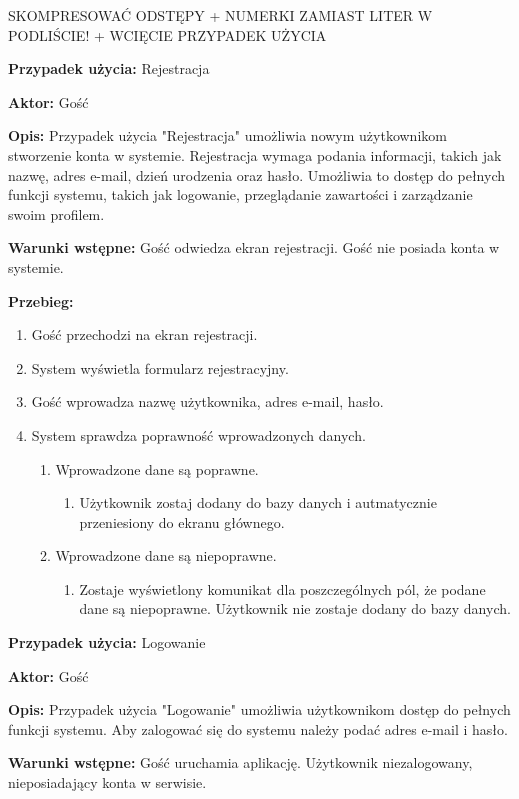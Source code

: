 SKOMPRESOWAĆ ODSTĘPY + NUMERKI ZAMIAST LITER W PODLIŚCIE! + WCIĘCIE PRZYPADEK UŻYCIA

\textbf{Przypadek użycia:} Rejestracja 

\textbf{Aktor:} Gość

\textbf{Opis:} Przypadek użycia "Rejestracja" umożliwia nowym użytkownikom stworzenie konta w systemie. Rejestracja wymaga podania informacji, takich jak nazwę, adres e-mail, dzień urodzenia oraz hasło. Umożliwia to dostęp do pełnych funkcji systemu, takich jak logowanie, przeglądanie zawartości i zarządzanie swoim profilem.

\textbf{Warunki wstępne:} Gość odwiedza ekran rejestracji. Gość nie posiada konta w systemie.

\textbf{Przebieg:}

\begin{enumerate}
	\item Gość przechodzi na ekran rejestracji.
	\item System wyświetla formularz rejestracyjny.
	\item Gość wprowadza nazwę użytkownika, adres e-mail, hasło.
	\item System sprawdza poprawność wprowadzonych danych.
	\begin{enumerate}
		\item Wprowadzone dane są poprawne.
		\begin{enumerate}
			\item Użytkownik zostaj dodany do bazy danych i autmatycznie przeniesiony do ekranu głównego.
		\end{enumerate}
		\item Wprowadzone dane są niepoprawne.
		\begin{enumerate}
			\item Zostaje wyświetlony komunikat dla poszczególnych pól, że podane dane są niepoprawne. Użytkownik nie zostaje dodany do bazy danych.
		\end{enumerate}
	\end{enumerate}
\end{enumerate}


\textbf{Przypadek użycia:} Logowanie

\textbf{Aktor:} Gość

\textbf{Opis:} Przypadek użycia "Logowanie" umożliwia użytkownikom dostęp do pełnych funkcji systemu. Aby zalogować się do systemu należy podać adres e-mail i hasło.

\textbf{Warunki wstępne:} Gość uruchamia aplikację. Użytkownik niezalogowany, nieposiadający konta w serwisie.

